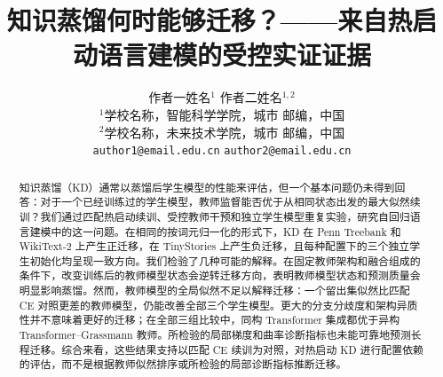 \documentclass[11pt]{article}
\title{知识蒸馏何时能够迁移？——来自热启动语言建模的受控实证证据}
\author{
  作者一姓名$^{1}$ \qquad 作者二姓名$^{1,2}$ \\
  $^{1}$学校名称，智能科学学院，城市 邮编，中国 \\
  $^{2}$学校名称，未来技术学院，城市 邮编，中国 \\
  \texttt{author1@email.edu.cn} \qquad
  \texttt{author2@email.edu.cn}
}
\begin{document}
\maketitle
\begin{abstract}
知识蒸馏（KD）通常以蒸馏后学生模型的性能来评估，但一个基本问题仍未得到回答：对于一个已经训练过的学生模型，教师监督能否优于从相同状态出发的最大似然续训？我们通过匹配热启动续训、受控教师干预和独立学生模型重复实验，研究自回归语言建模中的这一问题。在相同的按词元归一化的形式下，KD 在 Penn Treebank 和 WikiText-2 上产生正迁移，在 TinyStories 上产生负迁移，且每种配置下的三个独立学生初始化均呈现一致方向。我们检验了几种可能的解释。在固定教师架构和融合组成的条件下，改变训练后的教师模型状态会逆转迁移方向，表明教师模型状态和预测质量会明显影响蒸馏。然而，教师模型的全局似然不足以解释迁移：一个留出集似然比匹配 CE 对照更差的教师模型，仍能改善全部三个学生模型。更大的分支分歧度和架构异质性并不意味着更好的迁移；在全部三组比较中，同构 Transformer 集成都优于异构 Transformer--Grassmann 教师。所检验的局部梯度和曲率诊断指标也未能可靠地预测长程迁移。综合来看，这些结果支持以匹配 CE 续训为对照，对热启动 KD 进行配置依赖的评估，而不是根据教师似然排序或所检验的局部诊断指标推断迁移。
\end{abstract}













\clearpage
\appendix
\setcounter{figure}{0}
\renewcommand{\thefigure}{A\arabic{figure}}
\renewcommand{\theHfigure}{appendix.\arabic{figure}}




\end{document}
